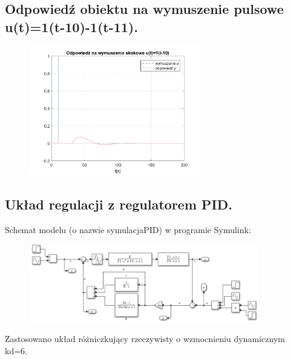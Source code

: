 \documentclass[a4paper]{article}
\begin{document}
\subsection{Odpowiedź obiektu na wymuszenie pulsowe u(t)=1(t-10)-1(t-11).}
\begin{figure}[H]
	\centering
	\includegraphics[width=7.5cm]{pkt2} 
\end{figure}

\subsection{Układ regulacji z regulatorem PID.}
Schemat modelu (o nazwie symulacjaPID) w programie Symulink:
\begin{figure}[H]
	\centering
	\includegraphics[width=10cm]{modelsymulacjaPID} 
\end{figure}
Zastosowano układ różniczkujący rzeczywisty o wzmocnieniu dynamicznym kd=6.
\end{document}
